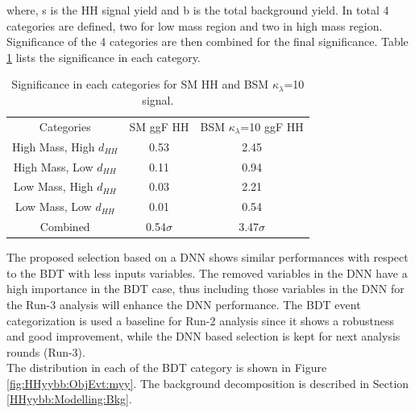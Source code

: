 where, s is the HH signal yield and b is the total background yield. In total 4 categories are defined, two for low mass region and two in high mass region. Significance of the 4 categories are then combined for the final significance. Table \ref{tab:Sig} lists the significance in each category.
\begin{table}[ht]
    \centering
    \begin{tabular}{ccc}
        \hline\hline
        Categories & SM ggF HH & BSM $\kappa_\lambda$=10 ggF HH \\
        High Mass, High $d_{HH}$ & 0.53 & 2.45 \\
        High Mass, Low $d_{HH}$ & 0.11 & 0.94 \\
        Low Mass, High $d_{HH}$ & 0.03 & 2.21 \\
        Low Mass, Low $d_{HH}$ & 0.01 & 0.54 \\
        \hline
        Combined & 0.54$\sigma$ & 3.47$\sigma$ \\
        \hline
        \hline
    \end{tabular}
    \caption{Significance in each categories for SM HH and BSM $\kappa_\lambda$=10 signal.}
    \label{tab:Sig}
\end{table}
The proposed selection based on a DNN shows similar performances with respect to the BDT with less inputs variables. The removed variables in the DNN have a high importance in the BDT case, thus including those variables in the DNN for the Run-3 analysis will enhance the DNN performance. The BDT event categorization is used a baseline for Run-2 \HHyybb analysis since it shows a robustness and good improvement, while the DNN based selection is kept for next analysis rounds (Run-3). \\

The \myy distribution in each of the BDT category is shown in Figure \ref{fig:HHyybb:ObjEvt:myy}. The background decomposition is described in Section \ref{HHyybb:Modelling:Bkg}.

